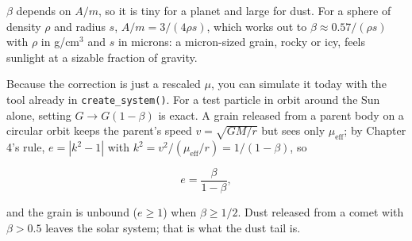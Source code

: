 \documentclass[
  10.5pt,
  letterpaper,
]{scrbook}
\theoremstyle{definition}
\theoremstyle{plain}
\theoremstyle{remark}
\begin{document}
\(\beta\) depends on \(A/m\), so it is tiny for a planet and large for
dust. For a sphere of density \(\rho\) and radius \(s\),
\(A/m = 3/(4\rho s)\), which works out to
\(\beta \approx 0.57/(\rho s)\) with \(\rho\) in g/cm\(^3\) and \(s\) in
microns: a micron-sized grain, rocky or icy, feels sunlight at a sizable
fraction of gravity.

Because the correction is just a rescaled \(\mu\), you can simulate it
today with the tool already in \texttt{create\_system()}. For a test
particle in orbit around the Sun alone, setting \(G \to G(1-\beta)\) is
exact. A grain released from a parent body on a circular orbit keeps the
parent's speed \(v = \sqrt{GM/r}\) but sees only \(\mu_{\mathrm{eff}}\);
by Chapter 4's rule, \(e = |k^2 - 1|\) with
\(k^2 = v^2/(\mu_{\mathrm{eff}}/r) = 1/(1-\beta)\), so

\[
e = \frac{\beta}{1-\beta},
\]

and the grain is unbound (\(e \ge 1\)) when \(\beta \ge 1/2\). Dust
released from a comet with \(\beta > 0.5\) leaves the solar system; that
is what the dust tail is.
\end{document}
